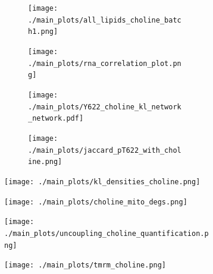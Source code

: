 \documentclass[12pt]{article}
\begin{document}
\begin{figure}[H]
\begin{subfigure}[t]{.24\textwidth}
        \begin{subfigure}[t]{\textwidth}
            \caption{}
            \texttt{[image: ./main\_plots/all\_lipids\_choline\_batch1.png]}        
        \end{subfigure} 
        \begin{subfigure}[t]{\textwidth}
            \caption{}
            \vspace{-0.5cm}
            \centering
            \texttt{[image: ./main\_plots/rna\_correlation\_plot.png]}        
        \end{subfigure}  
    \end{subfigure}  
    \hspace{.5cm}
    \begin{subfigure}[t]{.23\textwidth}
        \begin{subfigure}[t]{\textwidth}
            \caption{}
            \texttt{[image: ./main\_plots/Y622\_choline\_kl\_network\_network.pdf]}        
        \end{subfigure}  
        \begin{subfigure}[t]{\textwidth}
            \caption{}
            \texttt{[image: ./main\_plots/jaccard\_pT622\_with\_choline.png]}        
        \end{subfigure} 
    \end{subfigure} 
    \hspace{.25cm}
    \begin{subfigure}[t]{.45\textwidth}
        \caption{}
        \texttt{[image: ./main\_plots/kl\_densities\_choline.png]}        
    \end{subfigure}  
    \begin{subfigure}[t]{.3\textwidth}
        \caption{}
        \texttt{[image: ./main\_plots/choline\_mito\_degs.png]}        
    \end{subfigure}  
    \hspace{.4cm} 
    \begin{subfigure}[t]{.2\textwidth}
        \caption{}
\texttt{[image: ./main\_plots/uncoupling\_choline\_quantification.png]}        
    \end{subfigure}  
    \hspace{.4cm}  
    \begin{subfigure}[t]{.4\textwidth}
        \caption{}
        \vspace{-0.15cm}
        \texttt{[image: ./main\_plots/tmrm\_choline.png]}        
    \end{subfigure} 
   

\end{figure}
\end{document}

